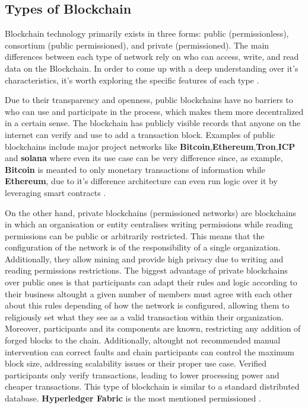 \subsection{Types of Blockchain}
Blockchain technology primarily exists in three forms: public (permissionless), consortium (public permissioned), and private (permissioned). The main differences between each type of network rely on who can access, write, and read data on the Blockchain. In order to come up with a deep understanding over it's characteristics, it's worth exploring the specific features of each type \cite{blockchain-in-heathcare}.

Due to their transparency and openness, public blockchains have no barriers to who can use and participate in the process, which makes them more decentralized in a certain sense.  The blockchain has publicly visible records that anyone on the internet can verify and use to add a transaction block. Examples of public blockchains include major project networks like \textbf{Bitcoin},\textbf{Ethereum},\textbf{Tron},\textbf{ICP} and \textbf{solana} where even its use case can be very difference since, as example, \textbf{Bitcoin} is meanted to only monetary transactions of information while \textbf{Ethereum}, due to it's difference architecture can even run logic over it by leveraging smart contracts  \cite{introduction-blockchain} \cite{blockchain-security-issues-and-challenges}.

On the other hand, private blockchains (permissioned networks) are blockchains in which an organisation or entity centralises writing permissions while reading permissions can be public or arbitrarily restricted. This means that the configuration of the network is of the responsibility of a single organization. Additionally, they allow mining and provide high privacy due to writing and reading permissions restrictions. The biggest advantage of private blockchains over public ones is that participants can adapt their rules and logic according to their business altought a given number of members must agree with each other about this rules depending of how the network is configured, allowing them to religiously set what they see as a valid transaction within their organization. Moreover, participants and its components are known, restricting any addition of forged blocks to the chain. Additionally, altought not recommended manual intervention can correct faults and chain participants can control the maximum block size, addressing scalability issues or their proper use case. Verified participants only verify transactions, leading to lower processing power and cheaper transactions. This type of blockchain is similar to a standard distributed database. \textbf{Hyperledger Fabric} is the most mentioned permissioned  \cite{data-processing-view-blockchain}.

